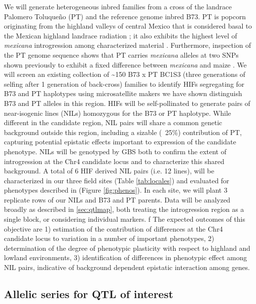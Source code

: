 We will generate heterogeneous inbred families \citep[HIFS;][]{tuinstra1997heterogeneous} from a cross of the landrace Palomero Toluque\~no (PT) and the reference genome inbred B73.  PT is popcorn originating from the highland valleys of central Mexico that is considered basal to the Mexican highland landrace radiation \citep{reif2006grouping}; it also exhibits the highest level of \emph{mexicana} introgression among characterized material \citep{Matsuoka2002}. Furthermore, inspection of the PT genome sequence \citep{Vielle-Calzada2009} shows that PT carries \emph{mexicana} alleles at two SNPs shown previously to exhibit a fixed difference between  \emph{mexicana} and maize \citep{Hufford2013}. We will screen an existing collection of \textasciitilde 150 B73 x PT BC1S3 (three generations of selfing after 1 generation of back-cross) families to identify HIFs segregating for B73 and PT haplotypes using microsatellite makers we have shown distinguish B73 and PT alleles in this region. HIFs will be self-pollinated to generate pairs of near-isogenic lines (NILs) homozygous for the B73 or PT haplotype. While different in the candidate region, NIL pairs will share a common genetic background outside this region, including a sizable (~25\%) contribution of PT, capturing potential epistatic effects important to expression of the candidate phenotype. NILs will be genotyped by GBS  \citep{Elshire 2011, Glaubitz2014} both to confirm the extent of introgression at the Chr4 candidate locus and to characterize this shared background. A total of 6 HIF derived NIL pairs (i.e. 12 lines), will be characterized in our three field sites (Table \ref{tab:locales}) and evaluated for phenotypes described in (Figure \ref{fig:phenos}). In each site, we will plant 3 replicate rows of our NILs and B73 and PT parents. Data will be analyzed broadly as described in \ref{sec:qtlmap}, both treating the introgression region as a single block, or considering individual markers.
f
The expected outcomes of this objective are 1) estimation of the contribution of differences at the Chr4 candidate locus to variation in a number of important phenotypes, 2) determination of the degree of phenotypic plasticity with respect to highland and lowland environments, 3) identification of differences in phenotypic effect among NIL pairs, indicative of background dependent epistatic interaction among genes.

\subsection{Allelic series for QTL of interest} \label{subsec:series}

